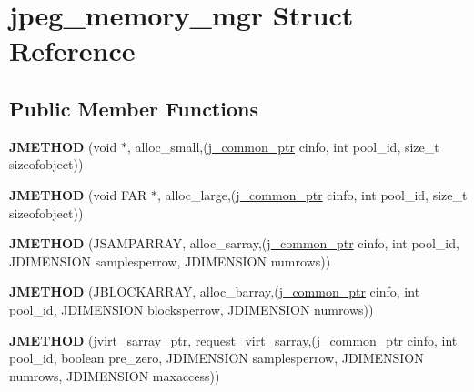 \hypertarget{structjpeg__memory__mgr}{\section{jpeg\+\_\+memory\+\_\+mgr Struct Reference}
\label{structjpeg__memory__mgr}
}
\subsection*{Public Member Functions}
\begin{DoxyCompactItemize}
\item 
\hypertarget{structjpeg__memory__mgr_a9372ad24444dda23175cc9203105911c}{{\bfseries J\+M\+E\+T\+H\+O\+D} (void $\ast$, alloc\+\_\+small,(\hyperlink{structjpeg__common__struct}{j\+\_\+common\+\_\+ptr} cinfo, int pool\+\_\+id, size\+\_\+t sizeofobject))}\label{structjpeg__memory__mgr_a9372ad24444dda23175cc9203105911c}

\item 
\hypertarget{structjpeg__memory__mgr_a130f6dbc700cc045bdbe35beff2cb326}{{\bfseries J\+M\+E\+T\+H\+O\+D} (void F\+A\+R $\ast$, alloc\+\_\+large,(\hyperlink{structjpeg__common__struct}{j\+\_\+common\+\_\+ptr} cinfo, int pool\+\_\+id, size\+\_\+t sizeofobject))}\label{structjpeg__memory__mgr_a130f6dbc700cc045bdbe35beff2cb326}

\item 
\hypertarget{structjpeg__memory__mgr_a3fdd2e1dfdc089fd61f17b608c0263f2}{{\bfseries J\+M\+E\+T\+H\+O\+D} (J\+S\+A\+M\+P\+A\+R\+R\+A\+Y, alloc\+\_\+sarray,(\hyperlink{structjpeg__common__struct}{j\+\_\+common\+\_\+ptr} cinfo, int pool\+\_\+id, J\+D\+I\+M\+E\+N\+S\+I\+O\+N samplesperrow, J\+D\+I\+M\+E\+N\+S\+I\+O\+N numrows))}\label{structjpeg__memory__mgr_a3fdd2e1dfdc089fd61f17b608c0263f2}

\item 
\hypertarget{structjpeg__memory__mgr_aefc8abe884dab5648c1e4e7ada2e2e18}{{\bfseries J\+M\+E\+T\+H\+O\+D} (J\+B\+L\+O\+C\+K\+A\+R\+R\+A\+Y, alloc\+\_\+barray,(\hyperlink{structjpeg__common__struct}{j\+\_\+common\+\_\+ptr} cinfo, int pool\+\_\+id, J\+D\+I\+M\+E\+N\+S\+I\+O\+N blocksperrow, J\+D\+I\+M\+E\+N\+S\+I\+O\+N numrows))}\label{structjpeg__memory__mgr_aefc8abe884dab5648c1e4e7ada2e2e18}

\item 
\hypertarget{structjpeg__memory__mgr_a34b830d9d7b2f4fd043e98421a700503}{{\bfseries J\+M\+E\+T\+H\+O\+D} (\hyperlink{structjvirt__sarray__control}{jvirt\+\_\+sarray\+\_\+ptr}, request\+\_\+virt\+\_\+sarray,(\hyperlink{structjpeg__common__struct}{j\+\_\+common\+\_\+ptr} cinfo, int pool\+\_\+id, boolean pre\+\_\+zero, J\+D\+I\+M\+E\+N\+S\+I\+O\+N samplesperrow, J\+D\+I\+M\+E\+N\+S\+I\+O\+N numrows, J\+D\+I\+M\+E\+N\+S\+I\+O\+N maxaccess))}\label{structjpeg__memory__mgr_a34b830d9d7b2f4fd043e98421a700503}


\end{DoxyCompactItemize}
